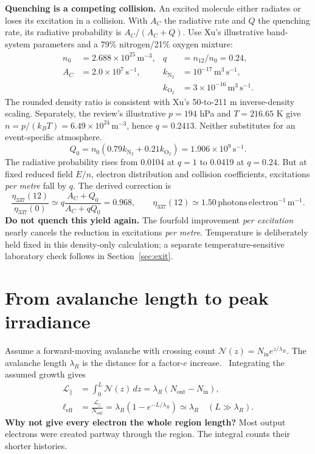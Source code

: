 \documentclass[11pt,a4paper]{article}
\newcommand{\unitseta}{\mathrm{photons\,electron^{-1}\,m^{-1}}}
\newcommand{\xu}[1]{~\cite[#1]{Xu2015}}
\begin{document}
\textbf{Quenching is a competing collision.} An excited molecule either radiates or loses its excitation in a collision. With $A_C$ the radiative rate and $Q$ the quenching rate, its radiative probability is $A_C/(A_C+Q)$. Use Xu's illustrative band-system parameters and a 79\% nitrogen/21\% oxygen mixture:\xu{Sec.~2.2}
\begin{align*}
n_0&=2.688\times10^{25}\,\mathrm{m^{-3}}, &q&=n_{12}/n_0=0.24,\\
A_C&=2.0\times10^7\,\mathrm{s^{-1}}, &k_{\mathrm{N_2}}&=10^{-17}\,\mathrm{m^3\,s^{-1}},\\
&&k_{\mathrm{O_2}}&=3\times10^{-16}\,\mathrm{m^3\,s^{-1}}.
\end{align*}
The rounded density ratio is consistent with Xu's 50-to-211 m inverse-density scaling. Separately, the review's illustrative $p=194$ hPa and $T=216.65$ K give $n=p/(k_BT)=6.49\times10^{24}\,\mathrm{m^{-3}}$, hence $q=0.2413$. Neither substitutes for an event-specific atmosphere.\xu{Sec.~4.2}
\begin{equation}
Q_0=n_0(0.79k_{\mathrm{N_2}}+0.21k_{\mathrm{O_2}})
=1.906\times10^9\,\mathrm{s^{-1}}.
\end{equation}
The radiative probability rises from 0.0104 at $q=1$ to 0.0419 at $q=0.24$. But at fixed reduced field $E/n$, electron distribution and collision coefficients, excitations \emph{per metre} fall by $q$. The derived correction is
\begin{equation}
\frac{\eta_{337}(12)}{\eta_{337}(0)}
\simeq q\frac{A_C+Q_0}{A_C+qQ_0}=0.968,
\qquad
\boxed{\eta_{337}(12)\simeq1.50\,\unitseta.}
\end{equation}
\textbf{Do not quench this yield again.} The fourfold improvement \emph{per excitation} nearly cancels the reduction in excitations \emph{per metre}. Temperature is deliberately held fixed in this density-only calculation; a separate temperature-sensitive laboratory check follows in Section~\ref{sec:exit}.

\clearpage
\section{From avalanche length to peak irradiance}\label{sec:tracks}
Assume a forward-moving avalanche with crossing count $\mathcal N(z)=N_{\mathrm{in}}e^{z/\lambda_R}$. The avalanche length $\lambda_R$ is the distance for a factor-$e$ increase.~\cite[Eq.~(3)]{Cramer2016} Integrating the assumed growth gives
\begin{align}
\mathcal L_{\parallel}&=\int_0^L\mathcal N(z)\,dz
=\lambda_R(N_{\mathrm{out}}-N_{\mathrm{in}}),\\
\ell_{\mathrm{eff}}&=\frac{\mathcal L_{\parallel}}{N_{\mathrm{out}}}
=\lambda_R(1-e^{-L/\lambda_R})\simeq\lambda_R\quad(L\gg\lambda_R).
\end{align}
\textbf{Why not give every electron the whole region length?} Most output electrons were created partway through the region. The integral counts their shorter histories.
\end{document}
